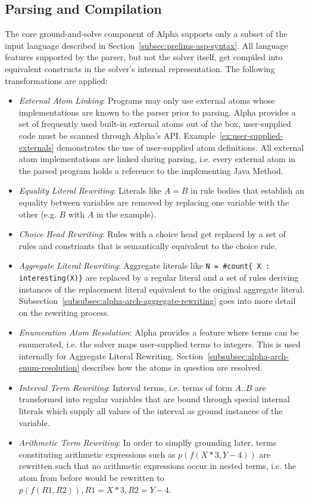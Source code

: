 \subsection{Parsing and Compilation}
\label{subsec:alpha-arch-compilation}

The core ground-and-solve component of Alpha supports only a subset of the input language described in Section~\ref{subsec:prelims-asp-syntax}. All language features supported by the parser, but not the solver itself, get compiled into equivalent constructs in the solver's internal representation. The following transformations are applied:
\begin{itemize}
    \item \emph{External Atom Linking}: Programs may only use external atoms whose implementations are known to the parser prior to parsing. Alpha provides a set of frequently used built-in external atoms out of the box, user-supplied code must be scanned through Alpha's API. Example~\ref{ex:user-supplied-externals} demonstrates the use of user-supplied atom definitions. All external atom implementations are linked during parsing, i.e. every external atom in the parsed program holds a reference to the implementing Java Method.
    \item \emph{Equality Literal Rewriting}: Literals like $A = B$ in rule bodies that establish an equality between variables are removed by replacing one variable with the other (e.g. $B$ with $A$ in the example). 
    \item \emph{Choice Head Rewriting}: Rules with a choice head get replaced by a set of rules and constriants that is semantically equivalent to the choice rule.
    \item \emph{Aggregate Literal Rewriting}: Aggregate literals like \texttt{N = \#count\{ X : interesting(X)\}} are replaced by a regular literal and a set of rules deriving instances of the replacement literal equivalent to the original aggregate literal. Subsection~\ref{subsubsec:alpha-arch-aggregate-rewriting} goes into more detail on the rewriting process.
    \item \emph{Enumeration Atom Resolution}: Alpha provides a feature where terms can be enumerated, i.e. the solver maps user-supplied terms to integers. This is used internally for Aggregate Literal Rewriting. Section~\ref{subsubsec:alpha-arch-enum-resolution} describes how the atoms in question are resolved.
    \item \emph{Interval Term Rewriting}: Interval terms, i.e. terms of form $A..B$ are transformed into regular variables that are bound through special internal literals which supply all values of the interval as ground instances of the variable.
    \item \emph{Arithmetic Term Rewriting}: In order to simplfy grounding later, terms constituting arithmetic expressions such as $p(f(X * 3, Y - 4))$ are rewritten such that no arithmetic expressions occur in nested terms, i.e. the atom from before would be rewritten to $p(f(R1, R2)), R1 = X * 3, R2 = Y - 4$.
\end{itemize}
